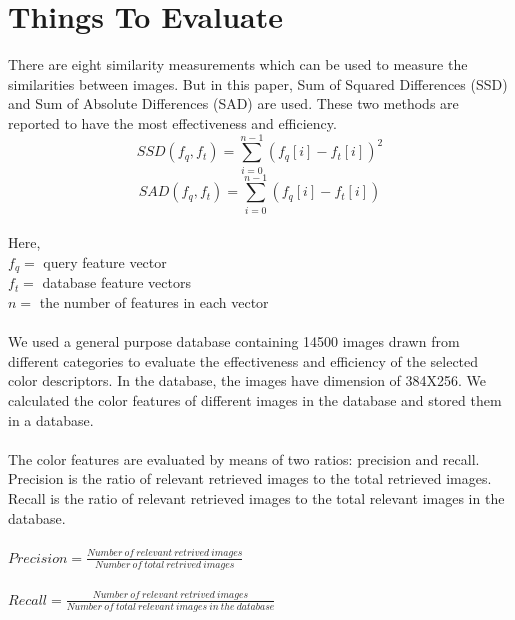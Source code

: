 \documentclass[pstricks,10pt]{report}
\begin{document}
\section{Things To Evaluate}
There are eight similarity measurements which can be used to measure the similarities between images. But in this paper, Sum of Squared Differences (SSD) and Sum of Absolute Differences (SAD) are used. These two methods are reported to have the most effectiveness and efficiency. 
\\
\begin{equation}
SSD(f_q,f_t)=\sum_{i=0}^{n-1}(f_q[i]-f_t[i])^2\label{eq:8}
\end{equation}
\begin{equation}
SAD(f_q,f_t)=\sum_{i=0}^{n-1}(f_q[i]-f_t[i])\label{eq:9}
\end{equation}
\\
Here,\\
$f_{q}=$ query feature vector\\
$f_{t}=$ database feature vectors\\
$n=$ the number of features in each vector\\
\\
We used a general purpose database containing 14500 images drawn from different categories to evaluate the effectiveness and efficiency of the selected color descriptors. In the database, the images have dimension of 384X256. We calculated the color features of different images in the database and stored them in a database.\\
\\
The color features are evaluated by means of two ratios: precision and recall. Precision is the ratio of relevant retrieved images to the total retrieved images. Recall is the ratio of relevant retrieved images to the total relevant images in the database.\\
\\
\large
$Precision=\frac{Number \: of\: relevant\: retrived\: images}{Number \: of\: total\: retrived\: images}$\\
\\
$Recall=\frac{Number \: of\: relevant\: retrived\: images}{Number \: of\: total\: relevant\: images \: in \: the\: database}$
\normalfont
\end{document}
